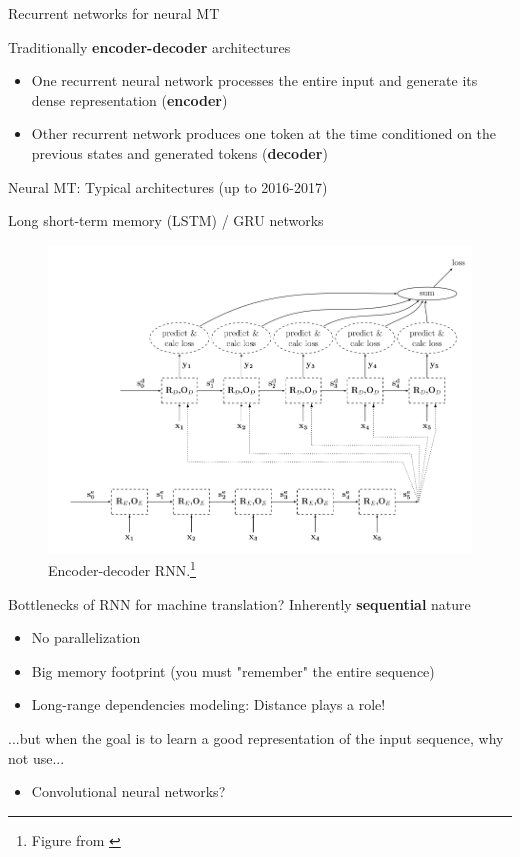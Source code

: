 \documentclass[12pt,aspectratio=169,handout]{beamer}
\begin{document}
\begin{frame}{Recurrent networks for neural MT}
	
	Traditionally \textbf{encoder-decoder} architectures	
	
	\begin{itemize}
		\item One recurrent neural network processes the entire input and generate its dense representation (\textbf{encoder})
		\item Other recurrent network produces one token at the time conditioned on the previous states and generated tokens (\textbf{decoder})
	\end{itemize}
\end{frame}


\begin{frame}{Neural MT: Typical architectures (up to 2016-2017)}
	
	Long short-term memory (LSTM) / GRU networks
	
	
	\begin{figure}
		\includegraphics[width=0.65\linewidth]{img/end-dec.png}
		\caption{Encoder-decoder RNN.\footnote{Figure from \citep{Goldberg.2016}}}
	\end{figure}
\end{frame}


\begin{frame}{Bottlenecks of RNN for machine translation?}
	Inherently \textbf{sequential} nature
	
	\begin{itemize}
		\item No parallelization
		\item Big memory footprint (you must "remember" the entire sequence)
		\item Long-range dependencies modeling: Distance plays a role!
	\end{itemize}
	
	...but when the goal is to learn a good representation of the input sequence, why not use...
	
	\begin{itemize}
		\item Convolutional neural networks?
	\end{itemize}
	
\end{frame}
\end{document}

